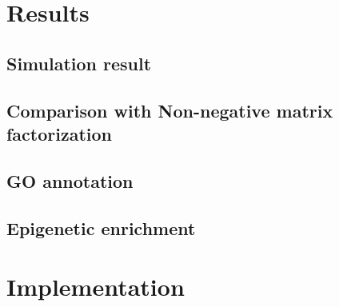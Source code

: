 \documentclass{article}
\begin{document}
\section{Results}
\subsection{Simulation result}
\subsection{Comparison with Non-negative matrix factorization}
\subsection{GO annotation}
\subsection{Epigenetic enrichment}
\section{Implementation}

\end{document}
